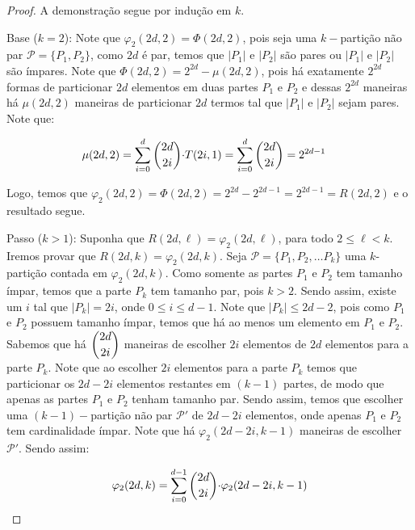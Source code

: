 \documentclass[12pt]{article}
\begin{document}
  \begin{proof}
  	A demonstração segue por indução em $k$.
  	
  	Base ($k = 2$): Note que $\varphi_2(2d, 2) = \Phi(2d, 2)$, pois seja uma $k-$partição não par $\mathcal{P}= \{P_1, P_2 \}$, como $2d$ é par, temos que $|P_1| \text{ e } |P_2|$ são pares ou $|P_1| \text{ e } |P_2|$ são ímpares. Note que $\Phi(2d, 2) = 2^{2d} - \mu(2d, 2)$, pois há exatamente $2^{2d}$ formas de particionar $2d$ elementos em duas partes $P_1$ e $P_2$ e dessas $2^{2d}$ maneiras há $\mu(2d, 2)$ maneiras de particionar $2d$ termos tal que $|P_1|$ e $|P_2|$ sejam pares. Note que:  
  	
  	\begin{align}
  		\begin{split}
  			\mu(2d, 2) &= \sum\limits_{i = 0}^{d}\escolhe{2d}{2i} {\cdot} T(2i, 1) = \sum\limits_{i = 0}^{d}\escolhe{2d}{2i} = 2^{2d-1}
  		\end{split} 
  	\end{align} 
  	
  	Logo, temos que $\varphi_2(2d, 2) = \Phi(2d, 2) = 2^{2d} - 2^{2d - 1} = 2^{2d - 1} = R(2d, 2)$ e o resultado segue. \newl
  	
  	
  	Passo ($k > 1$): Suponha que $R(2d, \ell) = \varphi_2(2d, \ell)$, para todo $2 \leq \ell < k$. Iremos provar que $R(2d, k) = \varphi_2(2d, k)$. Seja $\mathcal{P} = \{P_1, P_2, \ldots P_k \}$ uma $k$-partição contada em $\varphi_2(2d, k)$. Como somente as partes $P_1$ e $P_2$ tem tamanho ímpar, temos que a parte $P_k$ tem tamanho par, pois $k > 2$. Sendo assim, existe um $i$ tal que $|P_k| = 2i$, onde $0 \leq i \leq d - 1$. Note que $|P_k| \leq 2d - 2$, pois como $P_1$ e $P_2$ possuem tamanho ímpar, temos que há ao menos um elemento em $P_1$ e $P_2$. Sabemos que há $\escolhe{2d}{2i}$ maneiras de escolher $2i$ elementos de $2d$ elementos para a parte $P_k$. Note que ao escolher $2i$ elementos para a parte $P_k$ temos que particionar os $2d - 2i$ elementos restantes em $(k-1)$ partes, de modo que apenas as partes $P_1$ e $P_2$ tenham tamanho par. Sendo assim, temos que escolher uma $(k-1)-$partição não par $\mathcal{P'}$ de $2d - 2i$ elementos, onde apenas $P_1$ e $P_2$ tem cardinalidade ímpar. Note que há $\varphi_2(2d - 2i, k-1)$ maneiras de escolher $\mathcal{P'}$. Sendo assim: 
  	  
  	
  	\begin{align}
  		\begin{split}
  			\varphi_2(2d, k) = \sum\limits_{i = 0}^{d - 1}\escolhe{2d}{2i} {\cdot} \varphi_2(2d - 2i, k-1)
  		\end{split} 
  	\end{align} 
  	

\end{proof}
\end{document}
